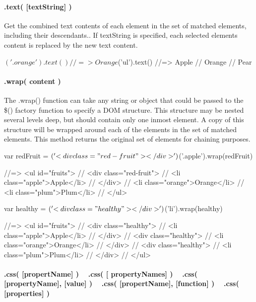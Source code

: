 \paragraph*{.text( \mbox{[}text\+String\mbox{]} )}

Get the combined text contents of each element in the set of matched elements, including their descendants.. If {\ttfamily text\+String} is specified, each selected element\textquotesingle{}s content is replaced by the new text content.


\begin{DoxyCode}
$('.orange').text()
//=> Orange

$('ul').text()
//=>  Apple
//    Orange
//    Pear
\end{DoxyCode}


\paragraph*{.wrap( content )}

The .wrap() function can take any string or object that could be passed to the \$() factory function to specify a D\+OM structure. This structure may be nested several levels deep, but should contain only one inmost element. A copy of this structure will be wrapped around each of the elements in the set of matched elements. This method returns the original set of elements for chaining purposes.


\begin{DoxyCode}
var redFruit = $('<div class="red-fruit"></div>')
$('.apple').wrap(redFruit)

//=> <ul id="fruits">
//     <div class="red-fruit">
//      <li class="apple">Apple</li>
//     </div>
//     <li class="orange">Orange</li>
//     <li class="plum">Plum</li>
//   </ul>

var healthy = $('<div class="healthy"></div>')
$('li').wrap(healthy)

//=> <ul id="fruits">
//     <div class="healthy">
//       <li class="apple">Apple</li>
//     </div>
//     <div class="healthy">
//       <li class="orange">Orange</li>
//     </div>
//     <div class="healthy">
//        <li class="plum">Plum</li>
//     </div>
//   </ul>
\end{DoxyCode}


\paragraph*{.css( \mbox{[}propert\+Name\mbox{]} ) ~\newline
 .css( \mbox{[} property\+Names\mbox{]} ) ~\newline
 .css( \mbox{[}property\+Name\mbox{]}, \mbox{[}value\mbox{]} ) ~\newline
 .css( \mbox{[}propert\+Name\mbox{]}, \mbox{[}function\mbox{]} ) ~\newline
 .css( \mbox{[}properties\mbox{]} )}

